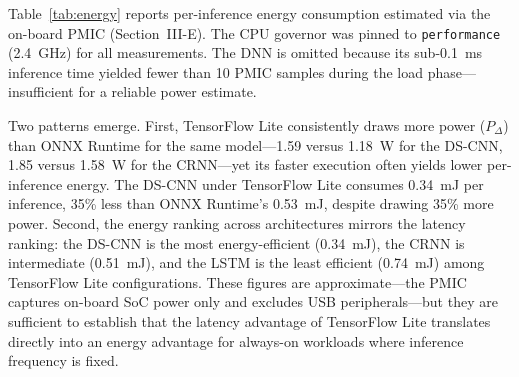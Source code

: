 \documentclass[conference,a4paper]{IEEEtran}
\begin{document}
Table~\ref{tab:energy} reports per-inference energy consumption estimated via the on-board PMIC (Section~III-E). The CPU governor was pinned to \texttt{performance} (2.4~GHz) for all measurements. The DNN is omitted because its sub-0.1~ms inference time yielded fewer than 10 PMIC samples during the load phase---insufficient for a reliable power estimate.

\begin{table}[t]
\caption{Per-inference energy on the Raspberry Pi 5 (performance governor, 2.4~GHz). $P_\Delta$ is the mean on-board SoC power during inference minus the idle baseline. Energy $E = P_\Delta \times t_\text{lat}$. The DNN is omitted due to insufficient PMIC sampling during its sub-0.1~ms inference (Section~III-E).}
\label{tab:energy}
\centering
{\footnotesize
\setlength{\tabcolsep}{3pt}
}
\end{table}

Two patterns emerge. First, TensorFlow Lite consistently draws more power ($P_\Delta$) than ONNX Runtime for the same model---1.59 versus 1.18~W for the DS-CNN, 1.85 versus 1.58~W for the CRNN---yet its faster execution often yields lower per-inference energy. The DS-CNN under TensorFlow Lite consumes 0.34~mJ per inference, 35\% less than ONNX Runtime's 0.53~mJ, despite drawing 35\% more power. Second, the energy ranking across architectures mirrors the latency ranking: the DS-CNN is the most energy-efficient (0.34~mJ), the CRNN is intermediate (0.51~mJ), and the LSTM is the least efficient (0.74~mJ) among TensorFlow Lite configurations. These figures are approximate---the PMIC captures on-board SoC power only and excludes USB peripherals---but they are sufficient to establish that the latency advantage of TensorFlow Lite translates directly into an energy advantage for always-on workloads where inference frequency is fixed.
\end{document}
